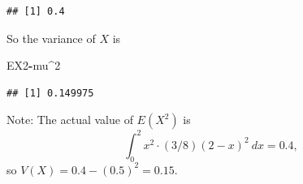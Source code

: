 \documentclass[
]{book}
\newenvironment{Shaded}{\begin{snugshade}}{\end{snugshade}}
\newcommand{\DecValTok}[1]{\textcolor[rgb]{0.00,0.00,0.81}{#1}}
\newcommand{\NormalTok}[1]{#1}
\newcommand{\SpecialCharTok}[1]{\textcolor[rgb]{0.81,0.36,0.00}{\textbf{#1}}}
\theoremstyle{definition}
\theoremstyle{definition}
\theoremstyle{definition}
\theoremstyle{definition}
\theoremstyle{remark}
\begin{document}
\begin{verbatim}
## [1] 0.4
\end{verbatim}

So the variance of \(X\) is

\begin{Shaded}
\begin{Highlighting}[]
\NormalTok{EX2}\SpecialCharTok{{-}}\NormalTok{mu}\SpecialCharTok{\^{}}\DecValTok{2}
\end{Highlighting}
\end{Shaded}

\begin{verbatim}
## [1] 0.149975
\end{verbatim}

Note: The actual value of \(E(X^2)\) is \[\int_0^2 x^2 \cdot (3/8)(2-x)^2~dx = 0.4,\]
so \(V(X) = 0.4 - (0.5)^2 = 0.15.\)

  

\printindex
\end{document}
